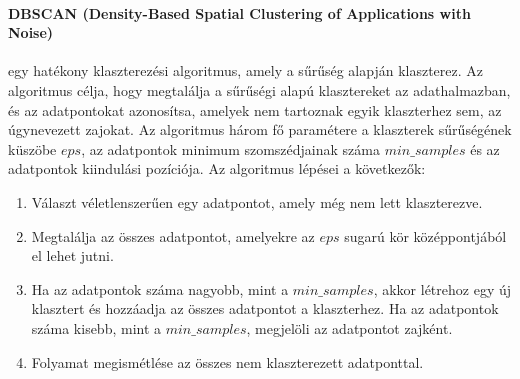 \documentclass[acmtog, authorversion]{acmart}
\begin{document}
\paragraph{DBSCAN (Density-Based Spatial Clustering of Applications with Noise)} egy hatékony klaszterezési algoritmus, amely a sűrűség alapján klaszterez. Az algoritmus célja, hogy megtalálja a sűrűségi alapú klasztereket az adathalmazban, és az adatpontokat azonosítsa, amelyek nem tartoznak egyik klaszterhez sem, az úgynevezett zajokat. Az algoritmus három fő paramétere a klaszterek sűrűségének küszöbe $eps$, az adatpontok minimum szomszédjainak száma $min\_samples$ és az adatpontok kiindulási pozíciója.
Az algoritmus lépései a következők:
\begin{enumerate}
    \item Választ véletlenszerűen egy adatpontot, amely még nem lett klaszterezve.
    \item Megtalálja az összes adatpontot, amelyekre az $eps$ sugarú kör középpontjából el lehet jutni.
    \item Ha az adatpontok száma nagyobb, mint a $min\_samples$, akkor létrehoz egy új klasztert és hozzáadja az összes adatpontot a klaszterhez. Ha az adatpontok száma kisebb, mint a $min\_samples$, megjelöli az adatpontot zajként.
    \item Folyamat megismétlése az összes nem klaszterezett adatponttal.
\end{enumerate}
\end{document}
